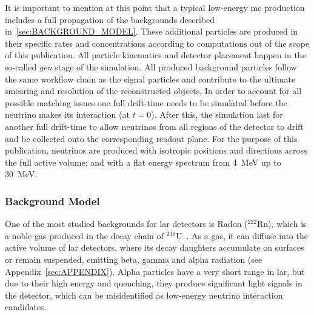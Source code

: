 It is important to mention at this point that a typical low-energy \gls{mc} production includes a full propagation of the backgrounds described in~\cref{sec:BACKGROUND_MODEL}. These additional particles are produced in their specific rates and concentrations according to computations out of the scope of this publication. All particle kinematics and detector placement happen in the so-called \emph{gen} stage of the simulation. All produced background particles follow the same workflow chain as the signal particles and contribute to the ultimate smearing and resolution of the reconstructed objects. In order to account for all possible matching issues one full drift-time needs to be simulated before the neutrino makes its interaction (at $t=0$). After this, the simulation last for another full drift-time to allow neutrinos from all regions of the detector to drift and be collected onto the corresponding readout plane. For the purpose of this publication, neutrinos are produced with isotropic positions and directions across the full active volume; and with a flat energy spectrum from \SI{4}{\mega\electronvolt} up to \SI{30}{\mega\electronvolt}.

\subsubsection{Background Model\label{sec:BACKGROUND_MODEL}}
One of the most studied backgrounds for \gls{lar} detectors is Radon (\(^{222}\text{Rn}\)), which is a noble gas produced in the decay chain of \(^{238}\text{U}\)~\cite{nndc_rn222,borexino_radon,MICROBOONE_RADON_2022}. As a gas, it can diffuse into the active volume of \gls{lar} detectors, where its decay daughters accumulate on surfaces or remain suspended, emitting beta, gamma and alpha radiation (see Appendix~\cref{sec:APPENDIX}). Alpha particles have a very short range in \gls{lar}, but due to their high energy and quenching, they produce significant light signals in the detector, which can be misidentified as low-energy neutrino interaction candidates.

